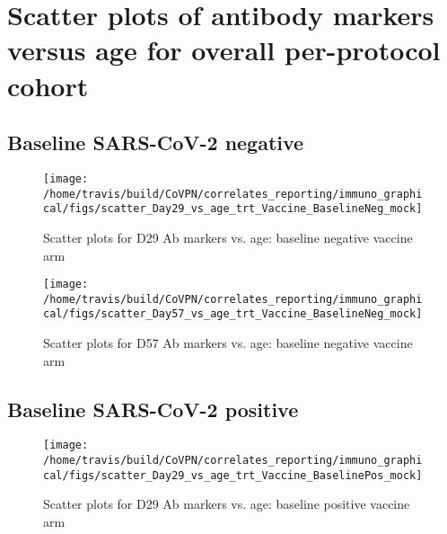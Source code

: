 \documentclass[]{book}
\theoremstyle{definition}
\theoremstyle{definition}
\theoremstyle{definition}
\newcommand{\1}{\mathbbm{1}}
\begin{document}
\clearpage

\hypertarget{scatter-plots-of-antibody-markers-versus-age-for-overall-per-protocol-cohort}{%
\section{Scatter plots of antibody markers versus age for overall per-protocol cohort}\label{scatter-plots-of-antibody-markers-versus-age-for-overall-per-protocol-cohort}}

\hypertarget{baseline-sars-cov-2-negative-1}{%
\subsection{Baseline SARS-CoV-2 negative}\label{baseline-sars-cov-2-negative-1}}

\begin{figure}[H]

{\centering \texttt{[image: /home/travis/build/CoVPN/correlates\_reporting/immuno\_graphical/figs/scatter\_Day29\_vs\_age\_trt\_Vaccine\_BaselineNeg\_mock]} 

}

\caption{Scatter plots for D29 Ab markers vs. age: baseline negative vaccine arm}\label{fig:unnamed-chunk-33}
\end{figure}

\clearpage
\begin{figure}[H]

{\centering \texttt{[image: /home/travis/build/CoVPN/correlates\_reporting/immuno\_graphical/figs/scatter\_Day57\_vs\_age\_trt\_Vaccine\_BaselineNeg\_mock]} 

}

\caption{Scatter plots for D57 Ab markers vs. age: baseline negative vaccine arm}\label{fig:unnamed-chunk-34}
\end{figure}

\clearpage

\hypertarget{baseline-sars-cov-2-positive-1}{%
\subsection{Baseline SARS-CoV-2 positive}\label{baseline-sars-cov-2-positive-1}}

\begin{figure}[H]

{\centering \texttt{[image: /home/travis/build/CoVPN/correlates\_reporting/immuno\_graphical/figs/scatter\_Day29\_vs\_age\_trt\_Vaccine\_BaselinePos\_mock]} 

}

\caption{Scatter plots for D29 Ab markers vs. age: baseline positive vaccine arm}\label{fig:unnamed-chunk-35}
\end{figure}
\end{document}
